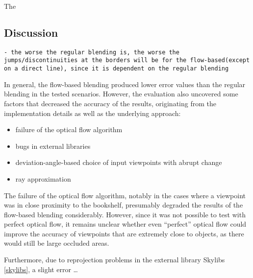The 

\subsection{Discussion} \label{subsec:discussion_virtual}
\begin{verbatim}
- the worse the regular blending is, the worse the jumps/discontinuities at the borders will be for the flow-based(except on a direct line), since it is dependent on the regular blending
\end{verbatim}

In general, the flow-based blending produced lower error values than the regular blending in the tested scenarios. However, the evaluation also uncovered some factors that decreased the accuracy of the results, originating from the implementation details as well as the underlying approach:

\begin{itemize}
  \item failure of the optical flow algorithm
  \item bugs in external libraries
  \item deviation-angle-based choice of input viewpoints with abrupt change
  \item ray approximation
\end{itemize}

The failure of the optical flow algorithm, notably in the cases where a viewpoint was in close proximity to the bookshelf, presumably degraded the results of the flow-based blending considerably. However, since it was not possible to test with perfect optical flow, it remains unclear whether even ``perfect'' optical flow could improve the accuracy of viewpoints that are extremely close to objects, as there would still be large occluded areas.

Furthermore, due to reprojection problems in the external library Skylibs \ref{skylibs}, a slight error \dots

